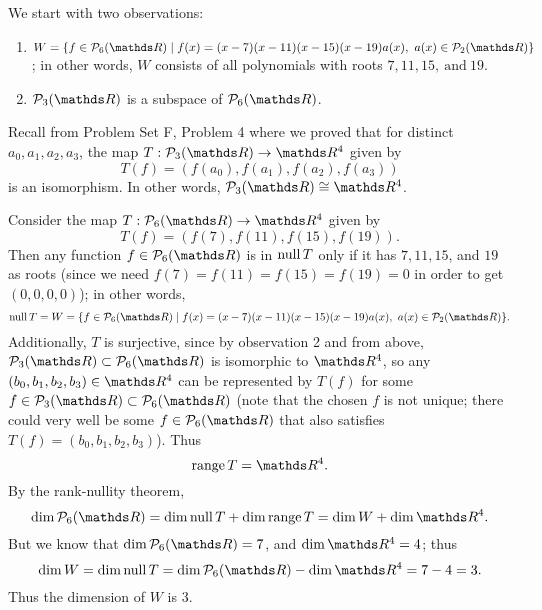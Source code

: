 \documentclass{homework}
\begin{document}
\begin{solution}
  We start with two observations:
  \begin{enumerate}
    \item $W=\{f\in \mc{P}_6(\R)\mid f(x)=(x-7)(x-11)(x-15)(x-19)a(x),\ a(x)\in \mc{P}_2(\R)\} $; in
      other words, $W$ consists of all polynomials with roots $7,11,15, ~\text{and}~19$.
    \item $\mc{P}_3(\R)$ is a subspace of $\mc{P}_6(\R)$.
  \end{enumerate}

  Recall from Problem Set F, Problem 4 where we proved that for distinct $a_0,a_1,a_2,a_3$, the map
  $T:\mc{P}_3(\R)\to \R^4$ given by \[
    T(f)=(f(a_0),f(a_1),f(a_2),f(a_3))
  \] is an isomorphism. In other words, $\mc{P}_3(\R)\cong \R^4$.

  Consider the map $T:\mc{P}_6(\R)\to \R^4$ given by \[
    T(f)=(f(7),f(11),f(15),f(19))
  .\] Then any function $f\in \mc{P}_6(\R)$ is in $\operatorname{null}{T}$ only if it has $7,11,15$, and $19$ as
  roots (since we need $f(7)=f(11)=f(15)=f(19)=0$ in order to get $(0,0,0,0)$); in other words, \[
    \Null{T}=W=\{f\in \mc{P}_6(\R)\mid f(x)=(x-7)(x-11)(x-15)(x-19)a(x),\ a(x)\in \mc{P}_2(\R)\} 
  .\] Additionally, $T$ is surjective, since by observation 2 and from above, $\mc{P}_3(\R)\subset
  \mc{P}_6(\R)$ is isomorphic to $\R^4$, so any $(b_0,b_1,b_2,b_3)\in \R^4$ can be represented by
  $T(f)$ for some $f\in \mc{P}_3(\R)\subset \mc{P}_6(\R)$ (note that the chosen $f$ is not unique;
  there could very well be some $f\in \mc{P}_6(\R)$ that also satisfies $T(f)=(b_0,b_1,b_2,b_3)$).
  Thus \[
    \range{T}=\R^4
  .\] By the rank-nullity theorem, \[
    \dim{\mc{P}_6(\R)}=\dim{\Null{T}}+\dim{\range{T}}=\dim{W}+\dim{\R^4}
  .\] But we know that $\dim{\mc{P}_6(\R)}=7$, and $\dim{\R^4}=4$; thus \[
    \dim{W}=\dim{\Null{T}}=\dim{\mc{P}_6(\R)}-\dim{\R^4}=7-4=3
  .\] Thus the dimension of $W$ is $3$.
\end{solution}
\end{document}
